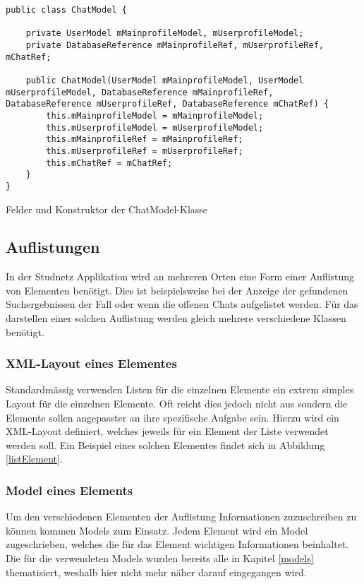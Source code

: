 \documentclass[../main.tex]{subfiles}
\begin{document}
\begin{code}
	\begin{center}
		\begin{verbatim}
public class ChatModel {

	private UserModel mMainprofileModel, mUserprofileModel;
	private DatabaseReference mMainprofileRef, mUserprofileRef, mChatRef;

	public ChatModel(UserModel mMainprofileModel, UserModel mUserprofileModel, DatabaseReference mMainprofileRef, DatabaseReference mUserprofileRef, DatabaseReference mChatRef) {
		this.mMainprofileModel = mMainprofileModel;
		this.mUserprofileModel = mUserprofileModel;
		this.mMainprofileRef = mMainprofileRef;
		this.mUserprofileRef = mUserprofileRef;
		this.mChatRef = mChatRef;
	}
}

		\end{verbatim}
		\caption{Felder und Konstruktor der ChatModel-Klasse}
		\label{chatModelConst}
	\end{center}
	
\end{code}
		
	\subsection{Auflistungen}
	In der Studnetz Applikation wird an mehreren Orten eine Form einer Auflistung von Elementen benötigt. Dies ist beispielsweise bei der Anzeige der gefundenen Suchergebnissen der Fall oder wenn die offenen Chats aufgelistet werden. Für das darstellen einer solchen Auflistung werden gleich mehrere verschiedene Klassen benötigt.
	
	\subsubsection{XML-Layout eines Elementes}
	Standardmässig verwenden Listen für die einzelnen Elemente ein extrem simples Layout für die einzelnen Elemente. Oft reicht dies jedoch nicht aus sondern die Elemente sollen angepasster an ihre spezifische Aufgabe sein. Hierzu wird ein XML-Layout definiert, welches jeweils für ein Element der Liste verwendet werden soll. Ein Beispiel eines solchen Elementes findet sich in Abbildung \ref{listElement}.

	\subsubsection{Model eines Elements}
	Um den verschiedenen Elementen der Auflistung Informationen zuzuschreiben zu können kommen Models zum Einsatz. Jedem Element wird ein Model zugeschrieben, welches die für das Element wichtigen Informationen beinhaltet. Die für die verwendeten Models wurden bereits alle in Kapitel \ref{models} thematisiert, weshalb hier nicht mehr näher darauf eingegangen wird.
	
\end{document}

